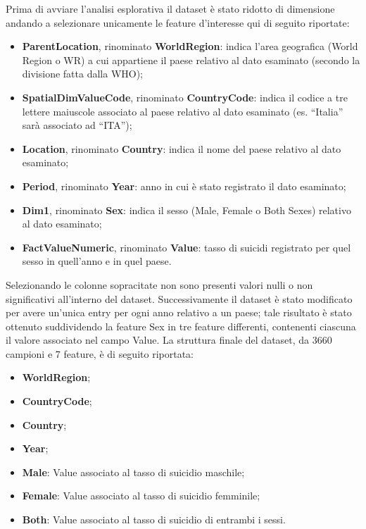 \documentclass[conference]{IEEEtran}
\begin{document}
Prima di avviare l'analisi esplorativa il dataset è stato ridotto di
dimensione andando a selezionare unicamente le feature d'interesse qui di seguito
riportate:
\begin{itemize}
    \item \textbf{ParentLocation}, rinominato \textbf{WorldRegion}: 
    indica l'area geografica (World Region o WR) a cui appartiene il paese relativo al dato
    esaminato (secondo la divisione fatta dalla WHO);
    \item \textbf{SpatialDimValueCode}, rinominato \textbf{CountryCode}: 
    indica il codice a tre lettere maiuscole associato al paese relativo
    al dato esaminato (es. ``Italia'' sarà associato ad ``ITA'');
    \item \textbf{Location}, rinominato \textbf{Country}: 
    indica il nome del paese  relativo al dato esaminato;
    \item \textbf{Period}, rinominato \textbf{Year}: 
    anno in cui è stato registrato il dato esaminato;
    \item \textbf{Dim1}, rinominato \textbf{Sex}: 
    indica il sesso (Male, Female o Both Sexes)
    relativo al dato esaminato;
    \item \textbf{FactValueNumeric}, rinominato \textbf{Value}: 
    tasso di suicidi registrato per quel sesso in quell'anno e in quel paese.
\end{itemize}
Selezionando le colonne sopracitate non sono presenti
valori nulli o non significativi all'interno del dataset.
Successivamente il dataset è stato modificato per
avere un'unica entry per ogni anno relativo a un paese;
tale risultato è stato ottenuto suddividendo la feature Sex
in tre feature differenti, contenenti ciascuna il valore associato nel campo Value.
La struttura finale del dataset, da 3660 campioni e 7 feature, è di seguito riportata:
\begin{itemize}
    \item \textbf{WorldRegion};
    \item \textbf{CountryCode};
    \item \textbf{Country};
    \item \textbf{Year};
    \item \textbf{Male}: Value associato al tasso di suicidio maschile;
    \item \textbf{Female}: Value associato al tasso di suicidio femminile;
    \item \textbf{Both}: Value associato al tasso di suicidio di entrambi i sessi.
\end{itemize}
\end{document}
